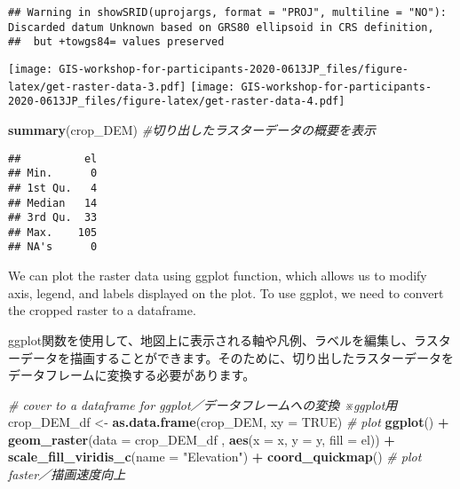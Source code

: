 \documentclass[
  xelatex,ja=standard]{bxjsarticle}
\newenvironment{Shaded}{\begin{snugshade}}{\end{snugshade}}
\newcommand{\CommentTok}[1]{\textcolor[rgb]{0.56,0.35,0.01}{\textit{#1}}}
\newcommand{\DataTypeTok}[1]{\textcolor[rgb]{0.13,0.29,0.53}{#1}}
\newcommand{\KeywordTok}[1]{\textcolor[rgb]{0.13,0.29,0.53}{\textbf{#1}}}
\newcommand{\NormalTok}[1]{#1}
\newcommand{\OperatorTok}[1]{\textcolor[rgb]{0.81,0.36,0.00}{\textbf{#1}}}
\newcommand{\OtherTok}[1]{\textcolor[rgb]{0.56,0.35,0.01}{#1}}
\newcommand{\StringTok}[1]{\textcolor[rgb]{0.31,0.60,0.02}{#1}}
\begin{document}
\begin{verbatim}
## Warning in showSRID(uprojargs, format = "PROJ", multiline = "NO"): Discarded datum Unknown based on GRS80 ellipsoid in CRS definition,
##  but +towgs84= values preserved
\end{verbatim}

\texttt{[image: GIS-workshop-for-participants-2020-0613JP\_files/figure-latex/get-raster-data-3.pdf]}
\texttt{[image: GIS-workshop-for-participants-2020-0613JP\_files/figure-latex/get-raster-data-4.pdf]}

\begin{Shaded}
\begin{Highlighting}[]
\KeywordTok{summary}\NormalTok{(crop_DEM) }\CommentTok{#切り出したラスターデータの概要を表示  }
\end{Highlighting}
\end{Shaded}

\begin{verbatim}
##          el
## Min.      0
## 1st Qu.   4
## Median   14
## 3rd Qu.  33
## Max.    105
## NA's      0
\end{verbatim}

We can plot the raster data using ggplot function, which allows us to
modify axis, legend, and labels displayed on the plot. To use ggplot, we
need to convert the cropped raster to a dataframe.

ggplot関数を使用して、地図上に表示される軸や凡例、ラベルを編集し、ラスターデータを描画することができます。そのために、切り出したラスターデータをデータフレームに変換する必要があります。

\begin{Shaded}
\begin{Highlighting}[]
\CommentTok{# cover to a dataframe for ggplot／データフレームへの変換 ※ggplot用}
\NormalTok{crop_DEM_df <-}\StringTok{ }\KeywordTok{as.data.frame}\NormalTok{(crop_DEM, }\DataTypeTok{xy =} \OtherTok{TRUE}\NormalTok{)}
\CommentTok{# plot}
\KeywordTok{ggplot}\NormalTok{() }\OperatorTok{+}
\StringTok{  }\KeywordTok{geom_raster}\NormalTok{(}\DataTypeTok{data =}\NormalTok{ crop_DEM_df , }\KeywordTok{aes}\NormalTok{(}\DataTypeTok{x =}\NormalTok{ x, }\DataTypeTok{y =}\NormalTok{ y, }\DataTypeTok{fill =}\NormalTok{ el)) }\OperatorTok{+}
\StringTok{  }\KeywordTok{scale_fill_viridis_c}\NormalTok{(}\DataTypeTok{name =} \StringTok{"Elevation"}\NormalTok{) }\OperatorTok{+}
\StringTok{  }\KeywordTok{coord_quickmap}\NormalTok{() }\CommentTok{# plot faster／描画速度向上  }
\end{Highlighting}
\end{Shaded}
\end{document}

